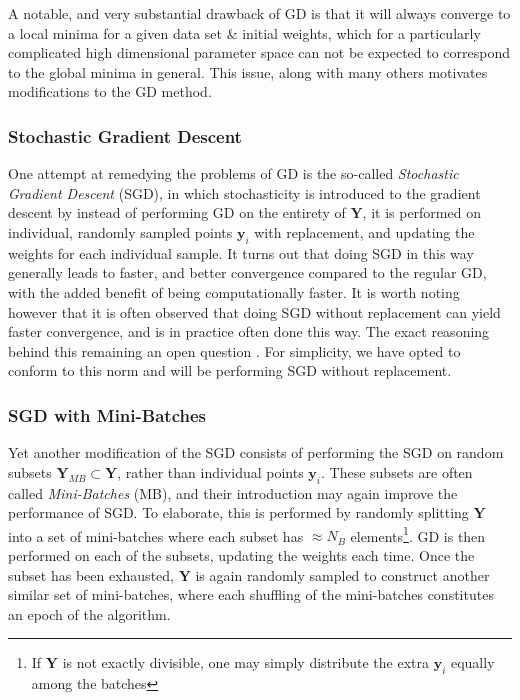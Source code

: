 \documentclass[reprint, english, nofootinbib]{revtex4-2}
\begin{document}
A notable, and very substantial drawback of GD is that it will always converge to a local minima for a given data set \& initial weights, which for a particularly complicated high dimensional parameter space can not be expected to correspond to the global minima in general. This issue, along with many others \cite[pp.15-16]{Mehta_2019} motivates modifications to the GD method.

\subsubsection{Stochastic Gradient Descent}
\noindent
One attempt at remedying the problems of GD is the so-called \textit{Stochastic Gradient Descent} (SGD), in which stochasticity is introduced to the gradient descent by instead of performing GD on the entirety of $\pmb Y$, it is performed on individual, randomly sampled points $\pmb y_i$ with replacement, and updating the weights for each individual sample.
It turns out that doing SGD in this way generally leads to faster, and better convergence compared to the regular GD, with the added benefit of being computationally faster. It is worth noting however that it is often observed that doing SGD without replacement can yield faster convergence, and is in practice often done this way. The exact reasoning behind this remaining an open question \cite{shamir2016withoutreplacement}\cite{pmlr-v97-nagaraj19a}. For simplicity, we have opted to conform to this norm and will be performing SGD without replacement.

\subsubsection{SGD with Mini-Batches}
\noindent
Yet another modification of the SGD consists of performing the SGD on random subsets $\pmb Y_{MB} \subset \pmb Y$, rather than individual points $\pmb y_i$. These subsets are often called \textit{Mini-Batches} (MB), and their introduction may again improve the performance of SGD. To elaborate, this is performed by randomly splitting $\pmb Y$ into a set of mini-batches where each subset has $\approx N_{B}$ elements\footnote{If $\pmb Y$ is not exactly divisible, one may simply distribute the extra $\pmb y_i$ equally among the batches}. GD is then performed on each of the subsets, updating the weights each time. Once the subset has been exhausted, $\pmb Y$ is again randomly sampled to construct another similar set of mini-batches, where each shuffling of the mini-batches constitutes an epoch of the algorithm.
\end{document}
